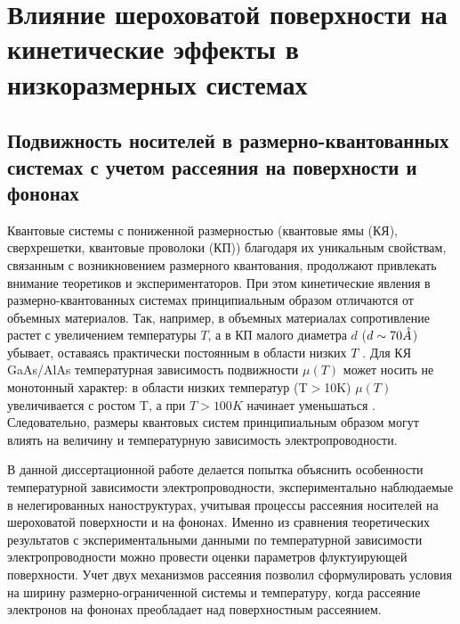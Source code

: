 \chapter{Влияние шероховатой поверхности на кинетические эффекты в низкоразмерных системах} \label{chapt3}

\section{ Подвижность носителей в размерно-квантованных системах с учетом рассеяния на поверхности и фононах}

Квантовые системы с пониженной размерностью (квантовые ямы (КЯ), сверхрешетки, квантовые проволоки (КП)) благодаря их уникальным свойствам, связанным с возникновением размерного квантования, продолжают привлекать внимание теоретиков и экспериментаторов. При этом кинетические явления в размерно-квантованных системах принципиальным образом отличаются от объемных материалов. Так, например, в объемных материалах сопротивление растет с увеличением температуры $T$, а в КП малого диаметра $d$ ($d \sim 70 \AA$) убывает, оставаясь практически постоянным в области низких $T$ \cite{Lin2000,Lin2003,Heremans1998,Zhang2000,Heremans2000}. Для КЯ GaAs/AlAs температурная зависимость подвижности $\mu (T)$ может носить не монотонный характер: в области низких температур (T$>$10K) $\mu (T)$ увеличивается с ростом T, а при $T>100K$ начинает уменьшаться \cite{Lin2000,Sakaki1987}. Следовательно, размеры квантовых систем принципиальным образом могут влиять на величину и температурную зависимость электропроводности.

В данной диссертационной работе делается попытка объяснить особенности температурной зависимости электропроводности, экспериментально наблюдаемые в нелегированных наноструктурах, учитывая процессы рассеяния носителей на шероховатой поверхности и на фононах. Именно из сравнения теоретических результатов с экспериментальными данными по температурной зависимости электропроводности можно провести оценки параметров флуктуирующей поверхности. Учет двух механизмов рассеяния позволил сформулировать условия на ширину размерно-ограниченной системы и температуру, когда рассеяние электронов на фононах преобладает над поверхностным рассеянием.

